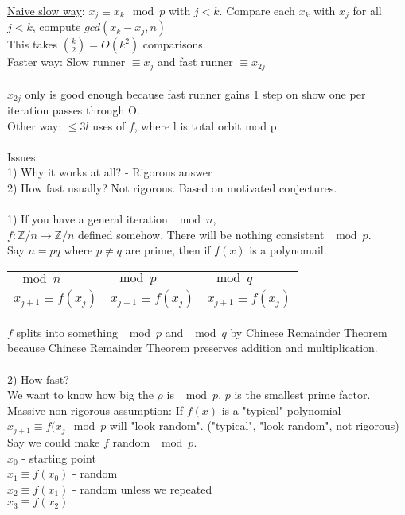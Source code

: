 \documentclass[13pt]{article}
\begin{document}
				\underline{Naive slow way}: 
				$x_j \equiv x_k \mod p$ with $j < k$. Compare
				each $x_k$ with $x_j$ for all $j < k$, compute $gcd(x_k - x_j, n)$\\
				This takes ${\binom{k}{2}} = O(k^2)$ comparisons.\\
				Faster way: Slow runner $\equiv x_j$ and fast runner 
				$\equiv x_{2j}$\\\\
				$x_{2j}$ only is good enough because fast runner gains 1 step on
				show one per iteration passes through O.\\
				Other way: $\le 3l$ uses of $f$, where l is total orbit mod p.\\\\
				Issues:\\ 
				1) Why it works at all? - Rigorous answer\\
				2) How fast usually? Not rigorous. Based on motivated
				conjectures.\\\\
				1) If you have a general iteration $\mod n$,\\
				$f: \mathbb{Z}/n \to \mathbb{Z}/n$ defined somehow. There will be
				nothing consistent $\mod p$.\\
				Say $n = pq$ where $p \not= q$ are prime, then if $f(x)$ is a
				polynomail.\\
				\begin{tabular}{l l l}
					$\mod n$ & $\mod p$ & $\mod q$\\
					$x_{j+1} \equiv f(x_j)$ &  $x_{j + 1} \equiv f(x_j)$ & $x_{j+1}
					\equiv f(x_j)$
				\end{tabular}
				$f$ splits into something $\mod p$ and $\mod q$ by Chinese Remainder
				Theorem because Chinese Remainder Theorem preserves addition and
				multiplication.\\\\
				2) How fast?\\
				We want to know how big the $\rho$ is $\mod p$. $p$ is the smallest 
				prime factor. Massive non-rigorous assumption: If $f(x)$ is a 
				"typical" polynomial $x_{j +1 } \equiv f(x_j \mod p$ will "look 
				random". ("typical", "look random", not rigorous)\\
				Say we could make $f$ random $\mod p$.\\
				$x_0$ - starting point\\
				$x_1 \equiv f(x_0)$ - random\\
				$x_2 \equiv f(x_1)$ - random unless we repeated\\
				$x_3 \equiv f(x_2)$
\end{document}
